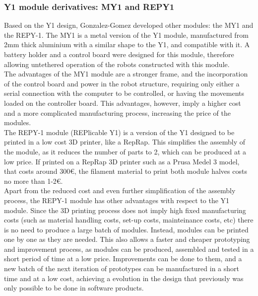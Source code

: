 \newpage
\subsubsection{Y1 module derivatives: MY1 and REPY1}
\label{hardware_repy1}

Based on the Y1 design, Gonzalez-Gomez developed other modules: the MY1 and the REPY-1. The MY1\cite{gonzalez-gomez_website:my1} is a metal version of the Y1 module, manufactured from 2mm thick aluminium with a similar shape to the Y1, and compatible with it. A battery holder and a control board were designed for this module, therefore allowing untethered operation of the robots constructed with this module.\\

The advantages of the MY1 module are a stronger frame, and the incorporation of the control board and power in the robot structure, requiring only either a serial connection with the computer to be controlled, or having the movements loaded on the controller board. This advantages, however, imply a higher cost and a more complicated manufacturing process, increasing the price of the modules.\\

The REPY-1\cite{gonzalez-gomez_website:repy1} module (REPlicable Y1) is a version of the Y1 designed to be printed in a low cost 3D printer, like a RepRap\cite{jones_reprap_2011}. This simplifies the assembly of the module, as it reduces the number of parts to 2, which can be produced at a low price. If printed on a RepRap 3D printer such as a Prusa Medel 3 model, that costs around 300\euro, the filament material to print both module halves costs no more than 1-2\euro.\\

Apart from the reduced cost and even further simplification of the assembly process, the REPY-1 module has other advantages with respect to the Y1 module. Since the 3D printing process does not imply high fixed manufacturing costs (such as material handling costs, set-up costs, mainteinance costs, etc) there is no need to produce a large batch of modules. Instead, modules can be printed one by one as they are needed. This also allows a faster and cheaper prototyping and improvement process, as modules can be produced, assembled and tested in a short period of time at a low price. Improvements can be done to them, and a new batch of the next iteration of prototypes can be manufactured in a short time and at a low cost, achieving a evolution in the design that previously was only possible to be done in software products.\\

